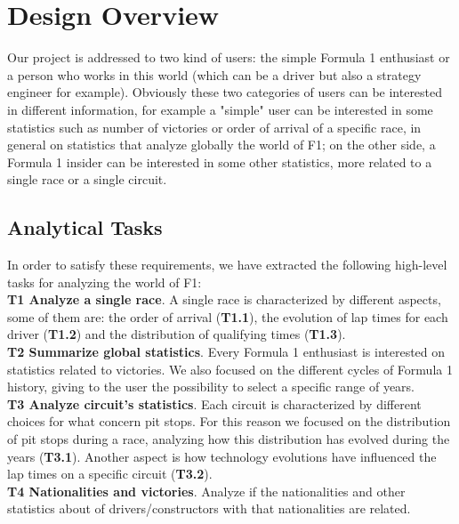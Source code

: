 \documentclass[11pt,twocolumn,letterpaper]{article}
\begin{document}
\section{Design Overview}
Our project is addressed to two kind of users: the simple Formula 1 enthusiast or a person who works in this world (which can be a driver but also a strategy engineer for example). Obviously these two categories of users can be interested in different information, for example a "simple" user can be interested in some statistics such as number of victories or order of arrival of a specific race, in general on statistics that analyze globally the world of F1; on the other side, a Formula 1 insider can be interested in some other statistics, more related to a single race or a single circuit.

\subsection{Analytical Tasks}
In order to satisfy these requirements, we have extracted the following high-level tasks for analyzing the world of F1:\\
\textbf{T1 Analyze a single race}. A single race is characterized by different aspects, some of them are: the order of arrival (\textbf{T1.1}), the evolution of lap times for each driver (\textbf{T1.2}) and the distribution of qualifying times (\textbf{T1.3}).\\
\textbf{T2 Summarize global statistics}. Every Formula 1 enthusiast is interested on statistics related to victories. We also focused on the different cycles of Formula 1 history, giving to the user the possibility to select a specific range of years.\\
\textbf{T3 Analyze circuit's statistics}. Each circuit is characterized by different choices for what concern pit stops. For this reason we focused on the distribution of pit stops during a race, analyzing how this distribution has evolved during the years (\textbf{T3.1}). Another aspect is how technology evolutions have influenced the lap times on a specific circuit (\textbf{T3.2}).\\
\textbf{T4 Nationalities and victories}. Analyze if the nationalities and other statistics about of drivers/constructors with that nationalities are related.
\end{document}
